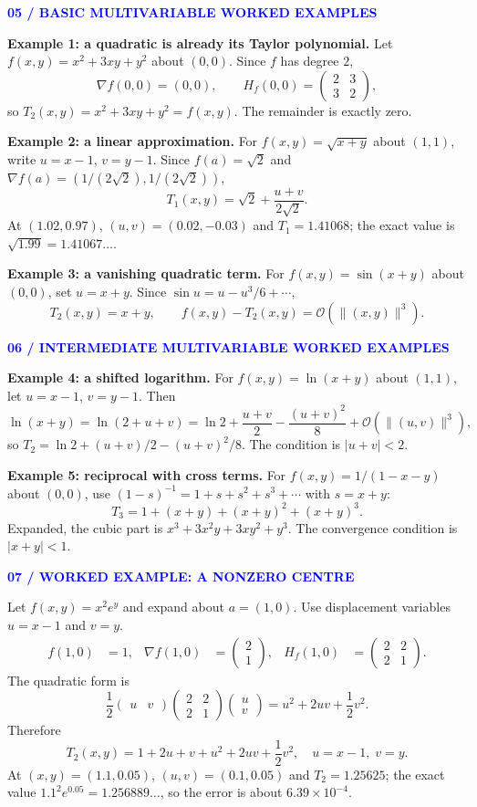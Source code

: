 \documentclass[10.5pt]{article}
\newcommand{\tagline}[1]{\par\medskip\textcolor{blue}{\sffamily\footnotesize\bfseries #1}\par\vspace{1pt}}
\begin{document}
\newpage
\tagline{05 / BASIC MULTIVARIABLE WORKED EXAMPLES}
\textbf{Example 1: a quadratic is already its Taylor polynomial.} Let $f(x,y)=x^2+3xy+y^2$ about $(0,0)$. Since $f$ has degree $2$,
\[
\nabla f(0,0)=(0,0),\qquad H_f(0,0)=\begin{pmatrix}2&3\\3&2\end{pmatrix},
\]
so $\boxed{T_2(x,y)=x^2+3xy+y^2=f(x,y)}$. The remainder is exactly zero.

\textbf{Example 2: a linear approximation.} For $f(x,y)=\sqrt{x+y}$ about $(1,1)$, write $u=x-1$, $v=y-1$. Since $f(a)=\sqrt2$ and $\nabla f(a)=(1/(2\sqrt2),1/(2\sqrt2))$,
\[
\boxed{T_1(x,y)=\sqrt2+\frac{u+v}{2\sqrt2}.}
\]
At $(1.02,0.97)$, $(u,v)=(0.02,-0.03)$ and $T_1=1.41068$; the exact value is $\sqrt{1.99}=1.41067\ldots$.

\textbf{Example 3: a vanishing quadratic term.} For $f(x,y)=\sin(x+y)$ about $(0,0)$, set $u=x+y$. Since $\sin u=u-u^3/6+\cdots$,
\[
\boxed{T_2(x,y)=x+y,\qquad f(x,y)-T_2(x,y)=\mathcal O(\|(x,y)\|^3).}
\]
\tagline{06 / INTERMEDIATE MULTIVARIABLE WORKED EXAMPLES}
\textbf{Example 4: a shifted logarithm.} For $f(x,y)=\ln(x+y)$ about $(1,1)$, let $u=x-1$, $v=y-1$. Then
\[
\ln(x+y)=\ln(2+u+v)=\ln2+\frac{u+v}{2}-\frac{(u+v)^2}{8}+\mathcal O(\|(u,v)\|^3),
\]
so $\boxed{T_2=\ln2+(u+v)/2-(u+v)^2/8}$. The condition is $|u+v|<2$.

\textbf{Example 5: reciprocal with cross terms.} For $f(x,y)=1/(1-x-y)$ about $(0,0)$, use $(1-s)^{-1}=1+s+s^2+s^3+\cdots$ with $s=x+y$:
\[
\boxed{T_3=1+(x+y)+(x+y)^2+(x+y)^3.}
\]
Expanded, the cubic part is $x^3+3x^2y+3xy^2+y^3$. The convergence condition is $|x+y|<1$.

\tagline{07 / WORKED EXAMPLE: A NONZERO CENTRE}
Let $f(x,y)=x^2e^y$ and expand about $a=(1,0)$. Use displacement variables $u=x-1$ and $v=y$.
\begin{align*}
f(1,0)&=1, & \nabla f(1,0)&=\begin{pmatrix}2\\1\end{pmatrix}, &
H_f(1,0)&=\begin{pmatrix}2&2\\2&1\end{pmatrix}.
\end{align*}
The quadratic form is
\[
\frac12\begin{pmatrix}u&v\end{pmatrix}
\begin{pmatrix}2&2\\2&1\end{pmatrix}
\begin{pmatrix}u\\v\end{pmatrix}=u^2+2uv+\frac12v^2.
\]
Therefore
\[
\boxed{T_2(x,y)=1+2u+v+u^2+2uv+\frac12v^2,\quad u=x-1,\;v=y.}
\]
At $(x,y)=(1.1,0.05)$, $(u,v)=(0.1,0.05)$ and $T_2=1.25625$; the exact value $1.1^2e^{0.05}=1.256889\ldots$, so the error is about $6.39\times10^{-4}$.
\end{document}
